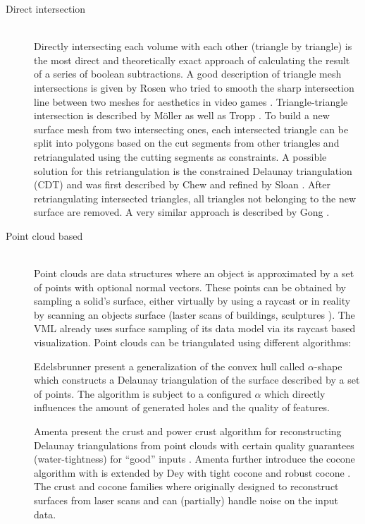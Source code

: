 \begin{description}
	
	\item[Direct intersection] \hfill \\
	Directly intersecting each volume with each other (triangle by triangle) is the most direct and theoretically exact approach of calculating the result of a series of boolean subtractions.
	A good description of triangle mesh intersections is given by Rosen who tried to smooth the sharp intersection line between two meshes for aesthetics in video games \cite{mesh_intersection}.
	Triangle-triangle intersection is described by Möller \cite{tri_tri_intersection_moller} as well as Tropp \etal \cite{tri_tri_intersection_2}.
	To build a new surface mesh from two intersecting ones, each intersected triangle can be split into polygons based on the cut segments from other triangles and retriangulated using the cutting segments as constraints.
	A possible solution for this retriangulation is the constrained Delaunay triangulation (CDT) and was first described by Chew \cite{cdt} and refined by Sloan \cite{cdt_fast}.
	After retriangulating intersected triangles, all triangles not belonging to the new surface are removed.
	A very similar approach is described by Gong \cite{cutter_workpiece_engagement}.
	
	
	\item[Point cloud based] \hfill \\
	Point clouds are data structures where an object is approximated by a set of points with optional normal vectors.
	These points can be obtained \eg by sampling a solid's surface, either virtually by \eg using a raycast or in reality by scanning an objects surface (\eg laster scans of buildings, sculptures \etc).
	The VML already uses surface sampling of its data model via its raycast based visualization.
	Point clouds can be triangulated using different algorithms:
	
	Edelsbrunner \etal present a generalization of the convex hull called $\alpha$-shape \cite{alpha_shape} which constructs a Delaunay triangulation of the surface described by a set of points.
	The algorithm is subject to a configured $\alpha$ which directly influences the amount of generated holes and the quality of features.
	
	Amenta \etal present the crust and power crust algorithm for reconstructing Delaunay triangulations from point clouds with certain quality guarantees (\eg water-tightness) for \enquote{good} inputs \cite{crust, power_crust}.
	Amenta \etal further introduce the cocone algorithm \cite{cocone} with is extended by Dey \etal with tight cocone and robust cocone \cite{tight_cocone, robust_cocone}.
	The crust and cocone families where originally designed to reconstruct surfaces from laser scans and can (partially) handle noise on the input data.
	

\end{description}
